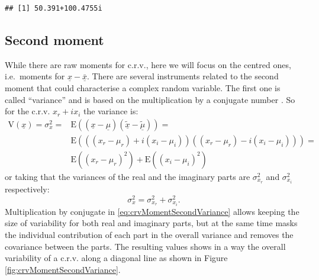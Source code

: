 \documentclass[
]{book}
\begin{document}
\begin{verbatim}
## [1] 50.391+100.4755i
\end{verbatim}

\hypertarget{crvSecondMoment}{%
\subsection{Second moment}\label{crvSecondMoment}}

While there are raw moments for c.r.v., here we will focus on the centred ones, i.e.~moments for \(\underline{x}-\bar{\underline{x}}\). There are several instruments related to the second moment that could characterise a complex random variable. The first one is called ``variance'' and is based on the multiplication by a conjugate number \citep{reference}. So for the c.r.v. \(x_r + i x_i\) the variance is:
\begin{equation}
    \begin{aligned}
    \mathrm{V}(\underline{x}) = \sigma_x^2 = & \mathrm{E}((\underline{x}-\underline{\mu}) (\tilde{\underline{x}}-\tilde{\underline{\mu}})) = \\
                 & \mathrm{E}\left(((x_r-\mu_{r}) + i (x_i-\mu_{i}))((x_r-\mu_{r}) - i (x_i-\mu_{i}))\right) = \\
                 & \mathrm{E}((x_r-\mu_{r})^2) +  \mathrm{E}((x_i-\mu_{i})^2)
    \end{aligned}
    \label{eq:crvMomentSecondVariance}
\end{equation}
or taking that the variances of the real and the imaginary parts are \(\sigma_{x_r}^2\) and \(\sigma_{x_i}^2\) respectively:
\begin{equation}
    \sigma_x^2 = \sigma_{x_r}^2 + \sigma_{x_i}^2.
    \label{eq:crvMomentSecondVarianceShort}
\end{equation}
Multiplication by conjugate in \eqref{eq:crvMomentSecondVariance} allows keeping the size of variability for both real and imaginary parts, but at the same time masks the individual contribution of each part in the overall variance and removes the covariance between the parts. The resulting values shows in a way the overall variability of a c.r.v. along a diagonal line as shown in Figure \ref{fig:crvMomentSecondVariance}.
\end{document}
